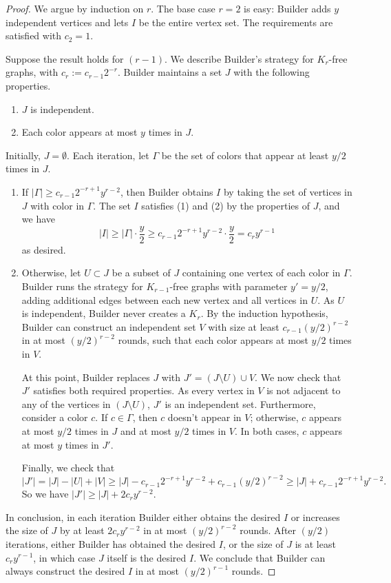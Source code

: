 \documentclass[10pt]{amsart}
\theoremstyle{definition}
\begin{document}
\begin{proof}
    We argue by induction on $r$. The base case $r = 2$ is easy: Builder adds $y$ independent vertices and lets $I$ be the entire vertex set. The requirements are satisfied with $c_2 = 1$.

    Suppose the result holds for $(r - 1)$. We describe Builder's strategy for $K_r$-free graphs, with $c_r := c_{r - 1} 2^{-r}$. Builder maintains a set $J$ with the following properties.
    \begin{enumerate}
        \item $J$ is independent.
        \item Each color appears at most $y$ times in $J$.
    \end{enumerate}
    Initially, $J = \emptyset$. Each iteration, let $\Gamma$ be the set of colors that appear at least $y/2$ times in $J$.
    \begin{enumerate}
        \item If $|\Gamma| \geq c_{r - 1} 2^{-r+1} y^{r - 2}$, then Builder obtains $I$ by taking the set of vertices in $J$ with color in $\Gamma$. The set $I$ satisfies (1) and (2) by the properties of $J$, and we have
        $$|I| \geq |\Gamma| \cdot \frac{y}{2} \geq c_{r - 1} 2^{-r+1} y^{r - 2} \cdot \frac{y}{2} = c_r y^{r - 1}$$
        as desired.
        \item Otherwise, let $U \subset J$ be a subset of $J$ containing one vertex of each color in $\Gamma$. Builder runs the strategy for $K_{r - 1}$-free graphs with parameter $y' = y / 2$, adding additional edges between each new vertex and all vertices in $U$. As $U$ is independent, Builder never creates a $K_r$. By the induction hypothesis, Builder can construct an independent set $V$ with size at least $c_{r - 1} (y/2)^{r - 2}$ in at most $(y / 2)^{r - 2}$ rounds, such that each color appears at most $y / 2$ times in $V$. 
        
        At this point, Builder replaces $J$ with $J' = (J \setminus U) \cup V$. We now check that $J'$ satisfies both required properties. As every vertex in $V$ is not adjacent to any of the vertices in $(J \setminus U)$, $J'$ is an independent set. Furthermore, consider a color $c$. If $c \in \Gamma$, then $c$ doesn't appear in $V$; otherwise, $c$ appears at most $y/2$ times in $J$ and at most $y/2$ times in $V$. In both cases, $c$ appears at most $y$ times in $J'$. 

        Finally, we check that 
        $$|J'| = |J| - |U| + |V| \geq |J| - c_{r - 1} 2^{-r+1} y^{r - 2} + c_{r - 1} (y/2)^{r - 2} \geq |J| + c_{r - 1} 2^{-r+1} y^{r - 2}.$$
        So we have $|J'| \geq |J| + 2c_r y^{r - 2}$.
    \end{enumerate}
    In conclusion, in each iteration Builder either obtains the desired $I$ or increases the size of $J$ by at least $2c_r y^{r - 2}$ in at most $(y/2)^{r - 2}$ rounds. After $(y / 2)$ iterations, either Builder has obtained the desired $I$, or the size of $J$ is at least $c_r y^{r - 1}$, in which case $J$ itself is the desired $I$. We conclude that Builder can always construct the desired $I$ in at most $(y/2)^{r - 1}$ rounds.
\end{proof}
\end{document}
